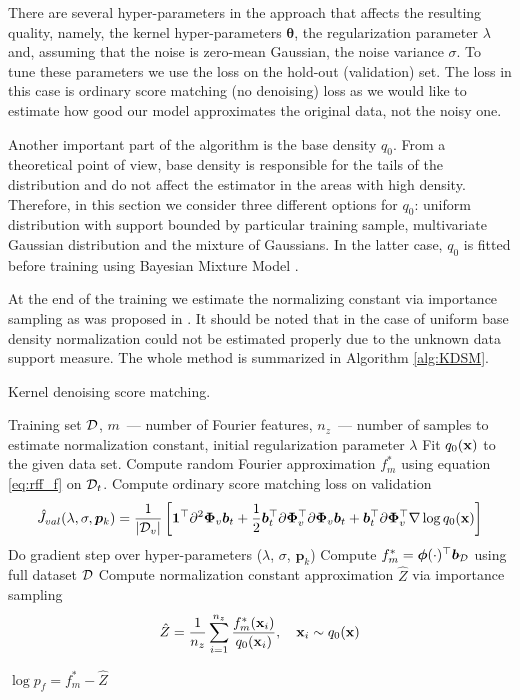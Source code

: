 There are several hyper-parameters in the approach that affects the resulting
quality, namely, the kernel hyper-parameters ${\bm \theta}$,
the regularization parameter $\lambda$ and,
assuming that the noise is zero-mean Gaussian, the noise variance $\sigma$.
To tune these parameters we use the loss on the hold-out (validation) set.
The loss in this case is ordinary score matching (no denoising) loss as we would like to estimate
how good our model approximates the original data, not the noisy one.

Another important part of the algorithm is the base density $q_0$.
From a theoretical point of view, base density is responsible for the tails of the
distribution and do not affect the estimator in the areas with high density.
Therefore, in this section we consider three different options for $q_0$:
uniform distribution with support bounded by particular training sample,
multivariate Gaussian distribution and the mixture of Gaussians.
In the latter case, $q_0$ is fitted before training using Bayesian Mixture Model \cite{bishop}.

At the end of the training we estimate the normalizing constant via importance sampling
as was proposed in \cite{GrettonDeep}.
It should be noted that in the case of uniform base density normalization could not be
estimated properly due to the unknown data support measure.
The whole method is summarized in Algorithm \ref{alg:KDSM}.
\begin{algorithm}
\caption{Kernel denoising score matching.}
\label{alg:KDSM}
\begin{algorithmic}[1]
    \Require Training set ${\cal D}$, $m$~--- number of Fourier features,
    $n_z$~--- number of samples to estimate normalization constant,
    initial regularization parameter $\lambda$
    \State Fit $q_0({\bf x})$ to the given data set.
            \State Compute random Fourier approximation $f_m^*$ using equation \eqref{eq:rff_f} on ${\cal D}_t$.
            \State Compute ordinary score matching loss on validation
            \[
                \hat{J}_{val}(\lambda, \sigma, {\bm p}_k) =
                \frac{1}{|{\cal D}_v|}\left[
                    {\bf 1}^{\top}\partial^2 \bm{\Phi}_{v}\bm{b}_t +
                    \frac{1}{2}\bm{b}_t^{\top}\partial \bm{\Phi}_{v}^{\top}
                    \partial \bm{\Phi}_{v}\bm{b}_t +
                    \bm{b}_t^{\top}\partial \bm{\Phi}_{v}^{\top} \nabla\log q_0({\bf x})
                \right]
            \]
            \State Do gradient step over hyper-parameters ($\lambda$, $\sigma$, ${\bm p}_k$)
        \EndFor
    \EndWhile
    \State Compute $f_m^* = \bm{\phi}(\cdot)^{\top}\bm{b}_{\cal D}$
    using full dataset ${\cal D}$
    \State Compute normalization constant approximation $\hat{Z}$ via importance sampling
    \[
        \hat{Z} = \frac{1}{n_z}\sum_{i = 1}^{n_z}\frac{f_m^*({\bf x}_i)}{q_0({\bf x}_i)},
        \quad {\bf x}_i \sim q_0({\bf x})
    \]
\end{algorithmic}
\Return $\log p_f = f_m^* - \hat{Z}$
\end{algorithm}


